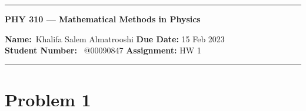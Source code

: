 \documentclass[]{article}
\title{}
\date{}
\newcommand{\bd}{\textbf}
\begin{document}
	\maketitle
	\begin{center}
		\hrule
		\vspace{.4cm}
		{\textbf { \large PHY 310 --- Mathematical Methods in Physics}}
	\end{center}
	{\bd{Name:}\ Khalifa Salem Almatrooshi \hspace{\fill} \bd{Due Date:} 15 Feb 2023 \\
		{ \bd{Student Number:}} \ @00090847 \hspace{\fill} \bd{Assignment:} HW 1 \\
		\hrule
		
		
	\section*{Problem 1}
}
\end{document}
